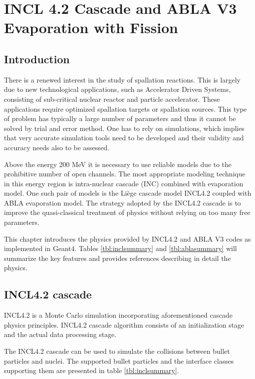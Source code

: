 \chapter{INCL 4.2 Cascade and ABLA V3 Evaporation with Fission}

\section{Introduction}

There is a renewed interest in the study of spallation reactions. This
is largely due to new technological applications, such as Accelerator
Driven Systems, consisting of sub-critical nuclear reactor and
particle accelerator. These applications require optimized spallation
targets or spallation sources. This type of problem has typically a large number
of parameters and thus it cannot be solved by trial and error
method. One has to rely on simulations, which implies that very
accurate simulation tools need to be developed and their validity and
accuracy needs also to be assessed.

Above the energy 200 MeV it is necessary to use reliable models due to
the prohibitive number of open channels. The most appropriate modeling
technique in this energy region is intra-nuclear cascade (INC) combined
with evaporation model. One such pair of models is the Li\`ege cascade
model INCL4.2 coupled with ABLA evaporation model. The strategy adopted
by the INCL4.2 cascade is to improve the quasi-classical treatment of
physics without relying on too many free parameters. 

This chapter introduces the physics provided by INCL4.2 and ABLA V3 codes as implemented in Geant4.
Tables \ref{tbl:inclsummary} and \ref{tbl:ablasummary} will summarize the key features 
and provides references describing in detail the physics.


\section{INCL4.2 cascade} 
\label{sec:inclmodel}

INCL4.2 is a Monte Carlo simulation incorporating aforementioned cascade
physics principles. INCL4.2 cascade algorithm consists of an
initialization stage and the actual data processing stage.


The INCL4.2 cascade can be used to simulate the collisions between
bullet particles and nuclei. The supported bullet particles and the
interface classes supporting them are presented in table
\ref{tbl:inclsummary}.


